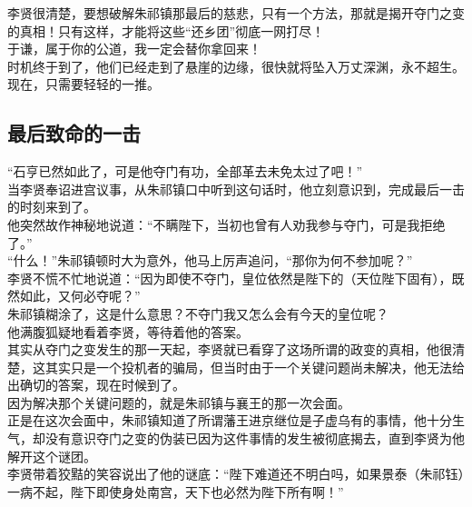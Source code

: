 \begin{multicols}{\theparacolNo}
李贤很清楚，要想破解朱祁镇那最后的慈悲，只有一个方法，那就是揭开夺门之变的真相！只有这样，才能将这些“还乡团”彻底一网打尽！\\

于谦，属于你的公道，我一定会替你拿回来！\\

时机终于到了，他们已经走到了悬崖的边缘，很快就将坠入万丈深渊，永不超生。\\

现在，只需要轻轻的一推。\\

\subsection{最后致命的一击}
“石亨已然如此了，可是他夺门有功，全部革去未免太过了吧！”\\

当李贤奉诏进宫议事，从朱祁镇口中听到这句话时，他立刻意识到，完成最后一击的时刻来到了。\\

他突然故作神秘地说道：“不瞒陛下，当初也曾有人劝我参与夺门，可是我拒绝了。”\\

“什么！”朱祁镇顿时大为意外，他马上厉声追问，“那你为何不参加呢？”\\

李贤不慌不忙地说道：“因为即使不夺门，皇位依然是陛下的（天位陛下固有），既然如此，又何必夺呢？”\\

朱祁镇糊涂了，这是什么意思？不夺门我又怎么会有今天的皇位呢？\\

他满腹狐疑地看着李贤，等待着他的答案。\\

其实从夺门之变发生的那一天起，李贤就已看穿了这场所谓的政变的真相，他很清楚，这其实只是一个投机者的骗局，但当时由于一个关键问题尚未解决，他无法给出确切的答案，现在时候到了。\\

因为解决那个关键问题的，就是朱祁镇与襄王的那一次会面。\\

正是在这次会面中，朱祁镇知道了所谓藩王进京继位是子虚乌有的事情，他十分生气，却没有意识夺门之变的伪装已因为这件事情的发生被彻底揭去，直到李贤为他解开这个谜团。\\

李贤带着狡黠的笑容说出了他的谜底：“陛下难道还不明白吗，如果景泰（朱祁钰）一病不起，陛下即使身处南宫，天下也必然为陛下所有啊！”\\


\end{multicols}
